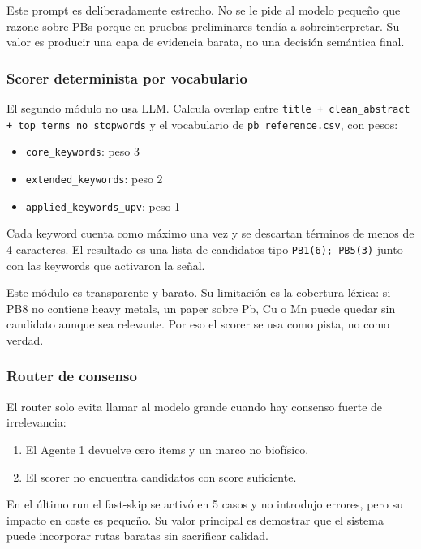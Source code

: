 Este prompt es deliberadamente estrecho. No se le pide al modelo pequeño que razone sobre PBs porque en pruebas preliminares tendía a sobreinterpretar. Su valor es producir una capa de evidencia barata, no una decisión semántica final.

\subsubsection{Scorer determinista por vocabulario}

El segundo módulo no usa LLM. Calcula overlap entre \texttt{title + clean\_abstract + top\_terms\_no\_stopwords} y el vocabulario de \texttt{pb\_reference.csv}, con pesos:

\begin{itemize}
\item \texttt{core\_keywords}: peso 3
\item \texttt{extended\_keywords}: peso 2
\item \texttt{applied\_keywords\_upv}: peso 1
\end{itemize}

Cada keyword cuenta como máximo una vez y se descartan términos de menos de 4 caracteres. El resultado es una lista de candidatos tipo \texttt{PB1(6); PB5(3)} junto con las keywords que activaron la señal.

Este módulo es transparente y barato. Su limitación es la cobertura léxica: si PB8 no contiene heavy metals, un paper sobre Pb, Cu o Mn puede quedar sin candidato aunque sea relevante. Por eso el scorer se usa como pista, no como verdad.

\subsubsection{Router de consenso}

El router solo evita llamar al modelo grande cuando hay consenso fuerte de irrelevancia:

\begin{enumerate}
\item El Agente 1 devuelve cero items y un marco no biofísico.
\item El scorer no encuentra candidatos con score suficiente.
\end{enumerate}

En el último run el fast-skip se activó en 5 casos y no introdujo errores, pero su impacto en coste es pequeño. Su valor principal es demostrar que el sistema puede incorporar rutas baratas sin sacrificar calidad.

